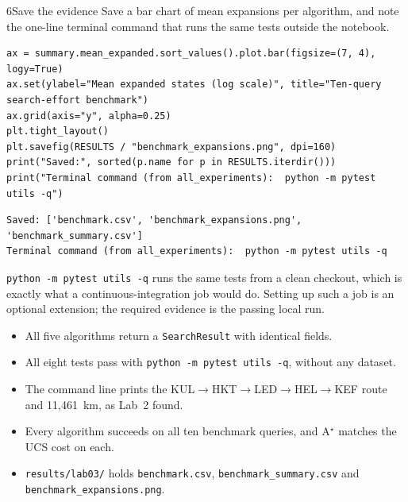 \begin{labquestion}{6}{Save the evidence}
Save a bar chart of mean expansions per algorithm, and note the one-line terminal command that runs the same tests outside the notebook.
\end{labquestion}

\begin{labanswer}
\begin{lstlisting}[style=utppython]
ax = summary.mean_expanded.sort_values().plot.bar(figsize=(7, 4), logy=True)
ax.set(ylabel="Mean expanded states (log scale)", title="Ten-query search-effort benchmark")
ax.grid(axis="y", alpha=0.25)
plt.tight_layout()
plt.savefig(RESULTS / "benchmark_expansions.png", dpi=160)
print("Saved:", sorted(p.name for p in RESULTS.iterdir()))
print("Terminal command (from all_experiments):  python -m pytest utils -q")
\end{lstlisting}
\expectedoutput
\begin{lstlisting}[style=utpterminal]
Saved: ['benchmark.csv', 'benchmark_expansions.png', 'benchmark_summary.csv']
Terminal command (from all_experiments):  python -m pytest utils -q
\end{lstlisting}
\texttt{python -m pytest utils -q} runs the same tests from a clean checkout, which is exactly what a continuous-integration job would do. Setting up such a job is an optional extension; the required evidence is the passing local run.
\end{labanswer}

\begin{verification}
\begin{itemize}
  \item All five algorithms return a \texttt{SearchResult} with identical fields.
  \item All eight tests pass with \texttt{python -m pytest utils -q}, without any dataset.
  \item The command line prints the KUL$\to$HKT$\to$LED$\to$HEL$\to$KEF route and 11,461~km, as Lab~2 found.
  \item Every algorithm succeeds on all ten benchmark queries, and A$^\star$ matches the UCS cost on each.
  \item \texttt{results/lab03/} holds \texttt{benchmark.csv}, \texttt{benchmark\_summary.csv} and \texttt{benchmark\_expansions.png}.
\end{itemize}
\end{verification}

